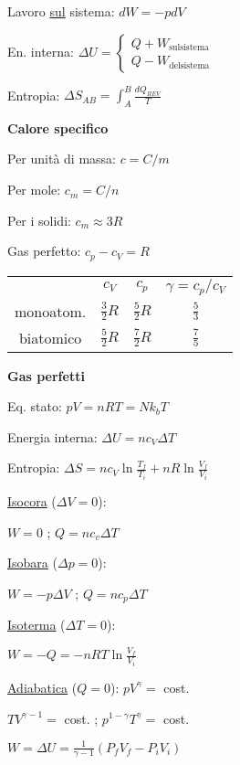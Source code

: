 \documentclass[10pt]{article}
\begin{document}
\begin{multicols}{3}
Lavoro \underline{sul} sistema: $dW = - p dV$

En. interna: $\Delta U = 
\left\{ \begin{matrix}
Q + W_\mathrm{sul sistema} \\
Q - W_\mathrm{del sistema}
 \end{matrix}\right.
$

Entropia: $\Delta S_{AB} = \displaystyle\int_{A}^{B} \frac{dQ_{REV}}{T} $

\textbf{Calore specifico}

Per unit\`a di massa: $c = C/m$

Per mole: $c_m = C/n$

Per i solidi: $c_m \approx 3R$

Gas perfetto: $c_p - c_V = R$

\begin{tabular}{c |c c c}
 & $c_V$ &$ c_p $& $ \gamma = c_p / c_V$ \\[2pt]
monoatom. & $\frac{3}{2}R$ & $\frac{5}{2}R$ & $\frac{5}{3}$ \\[2pt]
biatomico & $\frac{5}{2}R$ & $\frac{7}{2}R$ & $\frac{7}{5}$\\
\end{tabular}


\textbf{Gas perfetti}

Eq. stato: $pV = nRT = N k_b T$ 


Energia interna: $\Delta U = n c_V \Delta T $

Entropia: $\Delta S = n c_V \ln{\frac{T_f}{T_i}} + n R \ln{\frac{V_f}{V_i}} $


\underline{Isocora} ($\Delta V = 0$):

$W = 0$ ; $Q = n c_v \Delta T$

\underline{Isobara} ($\Delta p = 0$):

$W = - p \Delta V$ ;  $Q = n  c_p \Delta T$

\underline{Isoterma} ($\Delta T = 0$):

$W = -Q = - nRT \ln{\frac{V_f}{V_i}}$

\underline{Adiabatica} ($Q = 0$):  $pV^{\gamma} = $ cost. 

$TV^{\gamma - 1} = $ cost. ; $p^{1-\gamma} T^\gamma =$ cost. 

$W = \Delta U = \frac{1}{\gamma - 1} (P_f V_f - P_i V_i)$



\end{multicols}
\end{document}
